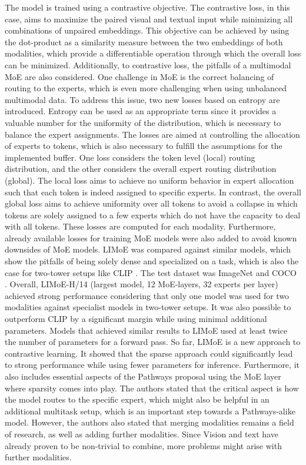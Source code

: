\documentclass[
]{krantz}
\begin{document}
The model is trained using a contrastive objective. The contrastive loss, in this case, aims to maximize the paired visual and textual input while minimizing all combinations of unpaired embeddings. This objective can be achieved by using the dot-product as a similarity measure between the two embeddings of both modalities, which provide a differentiable
operation through which the overall loss can be minimized. Additionally, to contrastive loss, the pitfalls of a multimodal MoE are also considered. One challenge in MoE is the correct balancing of routing to the experts, which is even more challenging when using unbalanced multimodal data. To address this issue, two new losses based on entropy are introduced. Entropy can be used as an appropriate term since it provides a valuable number for the uniformity of the distribution, which is necessary to balance the expert assignments. The losses are aimed at controlling the allocation of experts to tokens, which is also necessary to fulfill the assumptions for the implemented buffer. One loss considers the token level (local) routing distribution, and the other considers the overall expert routing distribution (global). The local loss aims to achieve no uniform behavior in expert allocation such that each token is indeed assigned to specific experts. In contrast, the overall global loss aims to achieve uniformity over all tokens to avoid a collapse in which tokens are solely assigned to a few experts which do not have the capacity to deal with all tokens. These losses are computed for each modality. Furthermore, already available losses for training MoE models were also added to avoid known downsides of MoE models. LIMoE was compared against similar models, which show the pitfalls of being solely dense and specialized on a task, which is also the case for two-tower setups like CLIP \citep{radford2021learning}. The test dataset was ImageNet \citep{deng2009imagenet} and COCO \citep{mccoco}. Overall, LIMoE-H/14 (largest model, 12 MoE-layers, 32 experts per layer) achieved strong performance considering that only one model was used for two modalities against specialist models in two-tower setups. It was also possible to outperform CLIP by a significant margin while using minimal additional parameters. Models that achieved similar results to LIMoE used at least twice the number of parameters for a forward pass.
So far, LIMoE is a new approach to contrastive learning. It showed that the sparse approach could significantly lead to strong performance while using fewer parameters for inference. Furthermore, it also includes essential aspects of the Pathways proposal using the MoE layer where sparsity comes into play. The authors stated that the critical aspect is how the model routes to the specific expert, which might also be helpful in an additional multitask setup, which is an important step towards a Pathways-alike model. However, the authors also stated that merging
modalities remains a field of research, as well as adding further modalities. Since Vision and text have already proven to be non-trivial to combine, more problems might arise with further modalities.
\end{document}
